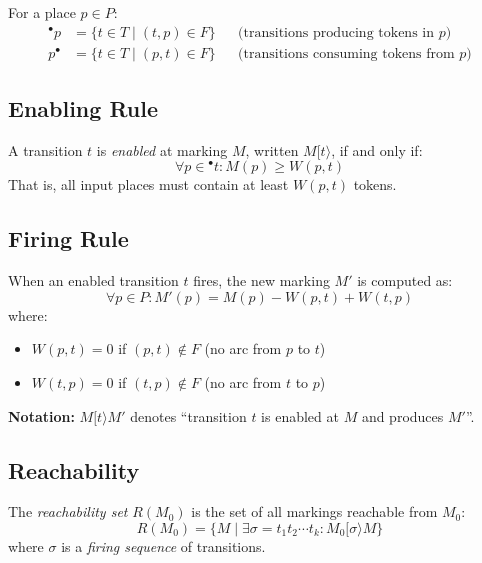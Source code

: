 For a place $p \in P$:
\begin{align}
{}^\bullet p &= \{t \in T \mid (t,p) \in F\} && \text{(transitions producing tokens in $p$)} \\
p^\bullet &= \{t \in T \mid (p,t) \in F\} && \text{(transitions consuming tokens from $p$)}
\end{align}

\subsection{Enabling Rule}
\label{subsec:enabling-rule}

A transition $t$ is \emph{enabled} at marking $M$, written $M[t\rangle$, if and only if:
%
\begin{equation}
\forall p \in {}^\bullet t: M(p) \geq W(p,t)
\end{equation}
%
That is, all input places must contain at least $W(p,t)$ tokens.

\subsection{Firing Rule}
\label{subsec:firing-rule}

When an enabled transition $t$ fires, the new marking $M'$ is computed as:
%
\begin{equation}
\forall p \in P: M'(p) = M(p) - W(p,t) + W(t,p)
\end{equation}
%
where:
\begin{itemize}
    \item $W(p,t) = 0$ if $(p,t) \notin F$ (no arc from $p$ to $t$)
    \item $W(t,p) = 0$ if $(t,p) \notin F$ (no arc from $t$ to $p$)
\end{itemize}

\noindent\textbf{Notation:} $M[t\rangle M'$ denotes ``transition $t$ is enabled at $M$ and produces $M'$''.

\subsection{Reachability}
\label{subsec:reachability}

The \emph{reachability set} $R(M_0)$ is the set of all markings reachable from $M_0$:
%
\begin{equation}
R(M_0) = \{M \mid \exists \sigma = t_1 t_2 \cdots t_k: M_0[\sigma\rangle M\}
\end{equation}
%
where $\sigma$ is a \emph{firing sequence} of transitions.

